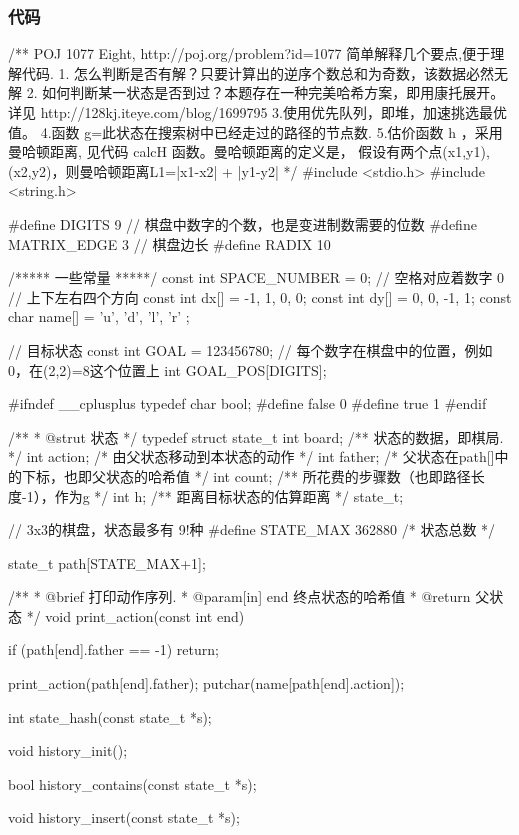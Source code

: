 \subsubsection{代码}
\begin{Codex}[label=eight_digits_astar.c]
/** POJ 1077 Eight, http://poj.org/problem?id=1077
 简单解释几个要点,便于理解代码.
1. 怎么判断是否有解？只要计算出的逆序个数总和为奇数，该数据必然无解
2. 如何判断某一状态是否到过？本题存在一种完美哈希方案，即用康托展开。
        详见 http://128kj.iteye.com/blog/1699795
3.使用优先队列，即堆，加速挑选最优值。
4.函数 g=此状态在搜索树中已经走过的路径的节点数.
5.估价函数 h ，采用曼哈顿距离, 见代码 calcH 函数。曼哈顿距离的定义是，
 假设有两个点(x1,y1),(x2,y2)，则曼哈顿距离L1=|x1-x2| + |y1-y2|
 */
#include <stdio.h>
#include <string.h>

#define DIGITS 9 // 棋盘中数字的个数，也是变进制数需要的位数
#define     MATRIX_EDGE 3       // 棋盘边长
#define RADIX 10

/***** 一些常量 *****/
const int SPACE_NUMBER = 0; // 空格对应着数字 0
// 上下左右四个方向
const int dx[] = {-1, 1, 0, 0};
const int dy[] = {0, 0, -1, 1};
const char name[] = { 'u', 'd', 'l', 'r' };

// 目标状态
const int GOAL = 123456780;
// 每个数字在棋盘中的位置，例如0，在(2,2)=8这个位置上
int GOAL_POS[DIGITS];

#ifndef __cplusplus
typedef char bool;
#define false 0
#define true 1
#endif

/**
 * @strut 状态
 */
typedef struct state_t {
    int board;  /** 状态的数据，即棋局. */
    int action; /* 由父状态移动到本状态的动作 */
    int father; /* 父状态在path[]中的下标，也即父状态的哈希值 */
    int count;  /** 所花费的步骤数（也即路径长度-1），作为g */
    int h; /** 距离目标状态的估算距离 */
} state_t;

// 3x3的棋盘，状态最多有 9!种
#define STATE_MAX 362880  /* 状态总数 */

state_t path[STATE_MAX+1];

/**
 * @brief 打印动作序列.
 * @param[in] end 终点状态的哈希值
 * @return 父状态
 */
void print_action(const int end) {
    if (path[end].father == -1) return;

    print_action(path[end].father);
    putchar(name[path[end].action]);
}

int state_hash(const state_t *s);

void history_init();

bool history_contains(const state_t *s);

void history_insert(const state_t *s);


\end{Codex}
